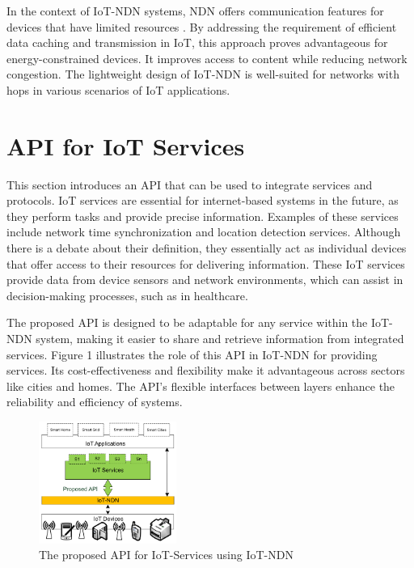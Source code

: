 \documentclass[10pt, twocolumn, journal]{IEEEtran}
\begin{document}
In the context of IoT-NDN systems, NDN offers communication features for devices that have limited resources \cite{hail2015iot}. By addressing the requirement of efficient data caching and transmission in IoT, this approach proves advantageous for energy-constrained devices. It improves access to content while reducing network congestion. The lightweight design of IoT-NDN is well-suited for networks with hops in various scenarios of IoT applications.

\section{API for IoT Services}
This section introduces an API that can be used to integrate services and protocols. IoT services are essential for internet-based systems in the future, as they perform tasks and provide precise information. Examples of these services include network time synchronization and location detection services. Although there is a debate about their definition, they essentially act as individual devices that offer access to their resources for delivering information. These IoT services provide data from device sensors and network environments, which can assist in decision-making processes, such as in healthcare.

The proposed API is designed to be adaptable for any service within the IoT-NDN system, making it easier to share and retrieve information from integrated services. Figure 1 illustrates the role of this API in IoT-NDN for providing services. Its cost-effectiveness and flexibility make it advantageous across sectors like cities and homes. The API's flexible interfaces between layers enhance the reliability and efficiency of systems.

\begin{figure}[ht]
    \centering
    \includegraphics[width=0.4\textwidth]{figure_1.png}
    \caption{The proposed API for IoT-Services using IoT-NDN}
    \label{fig:figure_1}
  \end{figure}
\end{document}
